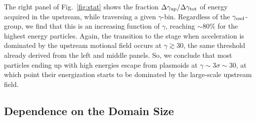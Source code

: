 \documentclass[twocolumn,twocolappendix]{aastex63}
\begin{document}

The right panel of Fig.~\ref{fig:stat} shows the fraction $\Delta \gamma_{\rm up}/\Delta \gamma_{\rm tot}$  of energy acquired in the upstream, while traversing a given $\gamma$-bin. Regardless of the $\gamma_{\rm end}$-group, we find that this is an increasing function of $\gamma$, reaching $\sim 80\%$ for the highest energy particles. Again, the transition to the stage when acceleration is dominated by the upstream motional field occurs at $\gamma\gtrsim 30$, the same threshold already derived from the left and middle panels. So, we conclude that most particles ending up with high energies escape from plasmoids at $\gamma\sim 3 \sigma\sim 30$, at which point their energization starts to be dominated by the large-scale upstream field.





\subsection{Dependence on the Domain Size}\label{3.3}
\end{document}
